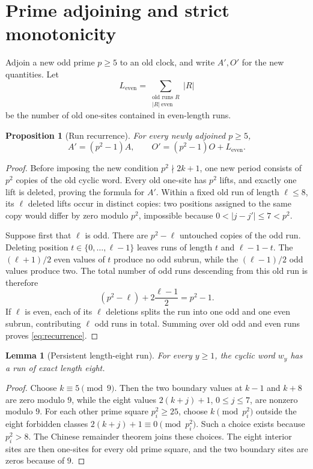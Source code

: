 \documentclass[11pt]{article}
\newtheorem{proposition}[theorem]{Proposition}
\newtheorem{lemma}[theorem]{Lemma}
\theoremstyle{definition}
\theoremstyle{remark}
\begin{document}
\section{Prime adjoining and strict monotonicity}

Adjoin a new odd prime $p\ge5$ to an old clock, and write $A',O'$ for the
new quantities.  Let
\begin{equation}
 L_{\mathrm{even}}=\sum_{\substack{\text{old runs }R\\ |R|\ \mathrm{even}}}|R|
 \label{eq:L-even}
\end{equation}
be the number of old one-sites contained in even-length runs.

\begin{proposition}[Run recurrence]
For every newly adjoined $p\ge5$,
\begin{equation}
       A'=(p^2-1)A,\qquad
       O'=(p^2-1)O+L_{\mathrm{even}}.
 \label{eq:recurrence}
\end{equation}
\end{proposition}

\begin{proof}
Before imposing the new condition $p^2\nmid2k+1$, one new period consists of
$p^2$ copies of the old cyclic word.  Every old one-site has $p^2$ lifts,
and exactly one lift is deleted, proving the formula for $A'$.  Within a
fixed old run of length $\ell\le8$, its $\ell$ deleted lifts occur in
distinct copies: two positions assigned to the same copy would differ by
zero modulo $p^2$, impossible because $0<|j-j'|\le7<p^2$.

Suppose first that $\ell$ is odd.  There are $p^2-\ell$ untouched copies of
the odd run.  Deleting position $t\in\{0,\ldots,\ell-1\}$ leaves runs of
length $t$ and $\ell-1-t$.  The $(\ell+1)/2$ even values of $t$ produce no
odd subrun, while the $(\ell-1)/2$ odd values produce two.  The total number
of odd runs descending from this old run is therefore
\[
 (p^2-\ell)+2\frac{\ell-1}{2}=p^2-1.
\]
If $\ell$ is even, each of its $\ell$ deletions splits the run into one odd
and one even subrun, contributing $\ell$ odd runs in total.  Summing over old
odd and even runs proves \eqref{eq:recurrence}.
\end{proof}

\begin{lemma}[Persistent length-eight run]
For every $y\ge1$, the cyclic word $w_y$ has a run of exact length eight.
\end{lemma}

\begin{proof}
Choose $k\equiv5\pmod9$.  Then the two boundary values at $k-1$ and $k+8$
are zero modulo $9$, while the eight values $2(k+j)+1$, $0\le j\le7$, are
nonzero modulo $9$.  For each other prime square $p_i^2\ge25$, choose
$k\pmod{p_i^2}$ outside the eight forbidden classes
$2(k+j)+1\equiv0\pmod{p_i^2}$.  Such a choice exists because $p_i^2>8$.
The Chinese remainder theorem joins these choices.  The eight interior sites
are then one-sites for every old prime square, and the two boundary sites are
zeros because of $9$.
\end{proof}
\end{document}
